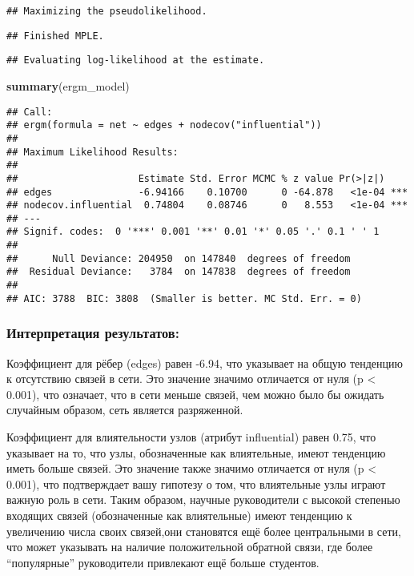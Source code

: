 \documentclass[
]{article}
\newenvironment{Shaded}{\begin{snugshade}}{\end{snugshade}}
\newcommand{\FunctionTok}[1]{\textcolor[rgb]{0.13,0.29,0.53}{\textbf{#1}}}
\newcommand{\NormalTok}[1]{#1}
\begin{document}
\begin{verbatim}
## Maximizing the pseudolikelihood.
\end{verbatim}

\begin{verbatim}
## Finished MPLE.
\end{verbatim}

\begin{verbatim}
## Evaluating log-likelihood at the estimate.
\end{verbatim}

\begin{Shaded}
\begin{Highlighting}[]
\FunctionTok{summary}\NormalTok{(ergm\_model)}
\end{Highlighting}
\end{Shaded}

\begin{verbatim}
## Call:
## ergm(formula = net ~ edges + nodecov("influential"))
## 
## Maximum Likelihood Results:
## 
##                     Estimate Std. Error MCMC % z value Pr(>|z|)    
## edges               -6.94166    0.10700      0 -64.878   <1e-04 ***
## nodecov.influential  0.74804    0.08746      0   8.553   <1e-04 ***
## ---
## Signif. codes:  0 '***' 0.001 '**' 0.01 '*' 0.05 '.' 0.1 ' ' 1
## 
##      Null Deviance: 204950  on 147840  degrees of freedom
##  Residual Deviance:   3784  on 147838  degrees of freedom
##  
## AIC: 3788  BIC: 3808  (Smaller is better. MC Std. Err. = 0)
\end{verbatim}

\hypertarget{ux438ux43dux442ux435ux440ux43fux440ux435ux442ux430ux446ux438ux44f-ux440ux435ux437ux443ux43bux44cux442ux430ux442ux43eux432-5}{%
\subsubsection{Интерпретация
результатов:}\label{ux438ux43dux442ux435ux440ux43fux440ux435ux442ux430ux446ux438ux44f-ux440ux435ux437ux443ux43bux44cux442ux430ux442ux43eux432-5}}

Коэффициент для рёбер (edges) равен -6.94, что указывает на общую
тенденцию к отсутствию связей в сети. Это значение значимо отличается от
нуля (p \textless{} 0.001), что означает, что в сети меньше связей, чем
можно было бы ожидать случайным образом, сеть является разряженной.

Коэффициент для влиятельности узлов (атрибут influential) равен 0.75,
что указывает на то, что узлы, обозначенные как влиятельные, имеют
тенденцию иметь больше связей. Это значение также значимо отличается от
нуля (p \textless{} 0.001), что подтверждает вашу гипотезу о том, что
влиятельные узлы играют важную роль в сети. Таким образом, научные
руководители с высокой степенью входящих связей (обозначенные как
влиятельные) имеют тенденцию к увеличению числа своих связей,они
становятся ещё более центральными в сети, что может указывать на наличие
положительной обратной связи, где более ``популярные'' руководители
привлекают ещё больше студентов.
\end{document}
